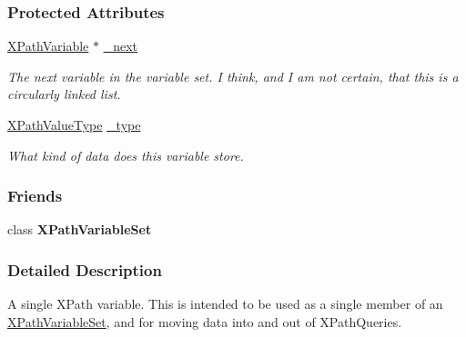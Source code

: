 \subsubsection*{Protected Attributes}
\begin{DoxyCompactItemize}
\item 
\hypertarget{classMezzanine_1_1xml_1_1XPathVariable_a6b104d269843eb7f651c053318d7acb3}{
\hyperlink{classMezzanine_1_1xml_1_1XPathVariable}{XPathVariable} $\ast$ \hyperlink{classMezzanine_1_1xml_1_1XPathVariable_a6b104d269843eb7f651c053318d7acb3}{\_\-next}}
\label{classMezzanine_1_1xml_1_1XPathVariable_a6b104d269843eb7f651c053318d7acb3}

\begin{DoxyCompactList}\small\item\em The next variable in the variable set. I think, and I am not certain, that this is a circularly linked list. \item\end{DoxyCompactList}\item 
\hypertarget{classMezzanine_1_1xml_1_1XPathVariable_a617d27cc3cccb38ee08e6de092ba9988}{
\hyperlink{namespaceMezzanine_1_1xml_aca3f7ad3597c316e5ee6c216e126e7b0}{XPathValueType} \hyperlink{classMezzanine_1_1xml_1_1XPathVariable_a617d27cc3cccb38ee08e6de092ba9988}{\_\-type}}
\label{classMezzanine_1_1xml_1_1XPathVariable_a617d27cc3cccb38ee08e6de092ba9988}

\begin{DoxyCompactList}\small\item\em What kind of data does this variable store. \item\end{DoxyCompactList}\end{DoxyCompactItemize}
\subsubsection*{Friends}
\begin{DoxyCompactItemize}
\item 
\hypertarget{classMezzanine_1_1xml_1_1XPathVariable_a6d8e28205e67fa0164160dd3cb547fe6}{
class {\bfseries XPathVariableSet}}
\label{classMezzanine_1_1xml_1_1XPathVariable_a6d8e28205e67fa0164160dd3cb547fe6}

\end{DoxyCompactItemize}


\subsubsection{Detailed Description}
A single XPath variable. This is intended to be used as a single member of an \hyperlink{classMezzanine_1_1xml_1_1XPathVariableSet}{XPathVariableSet}, and for moving data into and out of XPathQueries. 

